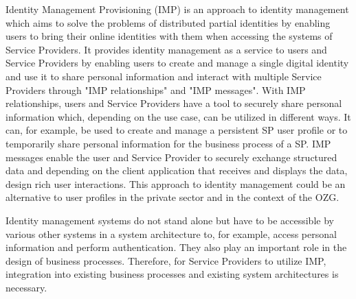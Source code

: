 Identity Management Provisioning (IMP) is an approach to identity management which aims to solve the problems of distributed partial identities by enabling users to bring their online identities with them when accessing the systems of Service Providers. It provides identity management as a service to users and Service Providers by enabling users to create and manage a single digital identity and use it to share personal information and interact with multiple Service Providers through "IMP relationships" and "IMP messages". With IMP relationships, users and Service Providers have a tool to securely share personal information which, depending on the use case, can be utilized in different ways. It can, for example, be used to create and manage a persistent SP user profile or to temporarily share personal information for the business process of a SP. IMP messages enable the user and Service Provider to securely exchange structured data and depending on the client application that receives and displays the data, design rich user interactions. This approach to identity management could be an alternative to user profiles in the private sector and in the context of the OZG.

Identity management systems do not stand alone but have to be accessible by various other systems in a system architecture to, for example, access personal information and perform authentication. They also play an important role in the design of business processes. Therefore, for Service Providers to utilize IMP, integration into existing business processes and existing system architectures is necessary.

